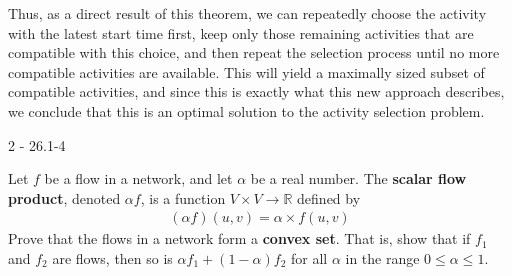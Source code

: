 \documentclass[11pt]{article}
\begin{document}
\begin{sol}
Thus, as a direct result of this theorem, we can repeatedly choose the activity with the latest start time first, keep only those remaining activities that are compatible with this choice, and then repeat the selection process until no more compatible activities are available. This will yield a maximally sized subset of compatible activities, and since this is exactly what this new approach describes, we conclude that this is an optimal solution to the activity selection problem.


\end{sol}

\begin{prob}{2 - 26.1-4}

Let $f$ be a flow in a network, and let $\alpha$ be a real number. The \textbf{scalar flow product}, denoted $\alpha f$, is a function $V \times V \to \mathbb{R}$ defined by
\begin{eqnarray*}
(\alpha f)(u,v) = \alpha \times f(u,v)
\end{eqnarray*}
Prove that the flows in a network form a \textbf{convex set}. That is, show that if $f_1$ and $f_2$ are flows, then so is $\alpha f_1 + (1 - \alpha)f_2$ for all $\alpha$ in the range $0 \leq \alpha \leq 1$.
\end{prob}
\end{document}
